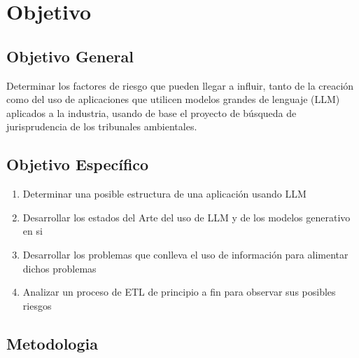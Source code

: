 
\chapter{Objetivo}

\section{Objetivo General}
Determinar los factores de riesgo que pueden llegar a influir, tanto de la creación como del uso de aplicaciones que utilicen modelos grandes de lenguaje (LLM) aplicados a la industria, usando de base el proyecto de búsqueda de jurisprudencia de los tribunales ambientales. 
\section{Objetivo Específico}

\begin{enumerate}
\item Determinar una posible estructura de una aplicación usando LLM
\item Desarrollar los estados del Arte del uso de LLM y de los modelos generativo en si
\item Desarrollar los problemas que conlleva el uso de información para alimentar dichos problemas
\item Analizar un proceso de ETL de principio a fin para observar sus posibles riesgos
\end{enumerate}

\section{Metodologia}








